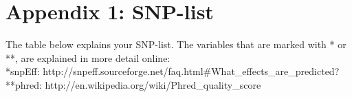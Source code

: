 \documentclass[a4paper,12pt]{article}
\begin{document}



\clearpage
\section*{Appendix 1: SNP-list}
The table below explains your SNP-list. The variables that are marked with * or **, are explained in more detail online:\\
*snpEff: http://snpeff.sourceforge.net/faq.html\#What_effects_are_predicted? **phred: http://en.wikipedia.org/wiki/Phred_quality_score
\end{document}
